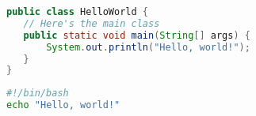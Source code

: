 \documentclass{article}
\begin{document}
\begin{lstlisting}[language=Java,caption={Java version}]
public class HelloWorld {
   // Here's the main class
   public static void main(String[] args) {
       System.out.println("Hello, world!");
   }
}
\end{lstlisting}

\begin{lstlisting}[language=bash,caption={bash version}]
#!/bin/bash
echo "Hello, world!"
\end{lstlisting}
\end{document}
